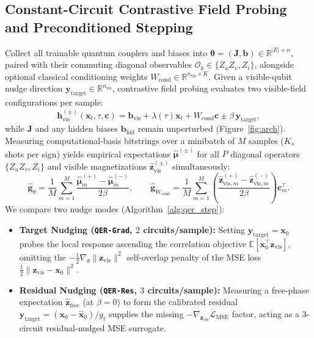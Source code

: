 \documentclass[11pt]{article}
\begin{document}
\subsection{Constant-Circuit Contrastive Field Probing and Preconditioned Stepping}
\label{sec:qer_opt}
Collect all trainable quantum couplers and biases into $\boldsymbol{\theta}=(\mathbf{J},\mathbf{b})\in\mathbb{R}^{|E|+n}$, paired with their commuting diagonal observables $\mathcal{O}_k \in \{Z_u Z_v, Z_i\}$, alongside optional classical conditioning weights $W_{\text{cond}} \in \mathbb{R}^{n_{\text{vis}}\times K}$. Given a visible-qubit nudge direction $\mathbf{y}_{\text{target}}\in\mathbb{R}^{n_{\text{vis}}}$, contrastive field probing evaluates two visible-field configurations per sample:
\begin{equation}
  \mathbf{h}_{\text{vis}}^{(\pm)}(\mathbf{x}_t,\tau,\mathbf{c}) = \mathbf{b}_{\text{vis}} + \lambda(\tau)\mathbf{x}_t + W_{\text{cond}}\mathbf{c} \pm \beta\,\mathbf{y}_{\text{target}},
  \label{eq:contrastive_fields}
\end{equation}
while $\mathbf{J}$ and any hidden biases $\mathbf{b}_{\text{hid}}$ remain unperturbed (Figure~\ref{fig:arch}). Measuring computational-basis bitstrings over a minibatch of $M$ samples ($K_s$ shots per sign) yields empirical expectations $\hat{\boldsymbol{\mu}}^{(\pm)}$ for all $P$ diagonal operators $\{Z_u Z_v, Z_i\}$ and visible magnetizations $\hat{\mathbf{z}}_{\text{vis}}^{(\pm)}$ simultaneously:
\begin{equation}
  \hat{\mathbf{g}}_\theta = \frac{1}{M}\sum_{m=1}^M \frac{\hat{\boldsymbol{\mu}}_m^{(+)}-\hat{\boldsymbol{\mu}}_m^{(-)}}{2\beta}, \qquad
  \hat{\mathbf{g}}_{W_{\text{cond}}} = \frac{1}{M}\sum_{m=1}^M \left(\frac{\hat{\mathbf{z}}_{\text{vis},m}^{(+)}-\hat{\mathbf{z}}_{\text{vis},m}^{(-)}}{2\beta}\right)\mathbf{c}_m^\top.
  \label{eq:qer_grads}
\end{equation}
We compare two nudge modes (Algorithm~\ref{alg:qer_step}):
\begin{itemize}[leftmargin=1.4em,itemsep=1pt,topsep=1pt]
  \item \textbf{Target Nudging (\texttt{QER-Grad}, $2$ circuits/sample):} Setting $\mathbf{y}_{\text{target}}{=}\mathbf{x}_0$ probes the local response ascending the correlation objective $\mathbb{E}[\mathbf{x}_0^\top\mathbf{z}_{\text{vis}}]$, omitting the $-\frac{1}{2}\nabla_\theta\|\mathbf{z}_{\text{vis}}\|^2$ self-overlap penalty of the MSE loss $\frac{1}{2}\|\mathbf{z}_{\text{vis}}-\mathbf{x}_0\|^2$.
  \item \textbf{Residual Nudging (\texttt{QER-Res}, $3$ circuits/sample):} Measuring a free-phase expectation $\hat{\mathbf{z}}_{\text{free}}$ (at $\beta{=}0$) to form the calibrated residual $\mathbf{y}_{\text{target}} = (\mathbf{x}_0 - \hat{\mathbf{x}}_0)/g_t$ supplies the missing $-\nabla_{\mathbf{z}_{\text{vis}}}\mathcal{L}_{\text{MSE}}$ factor, acting as a $3$-circuit residual-nudged MSE surrogate.
\end{itemize}
\end{document}
